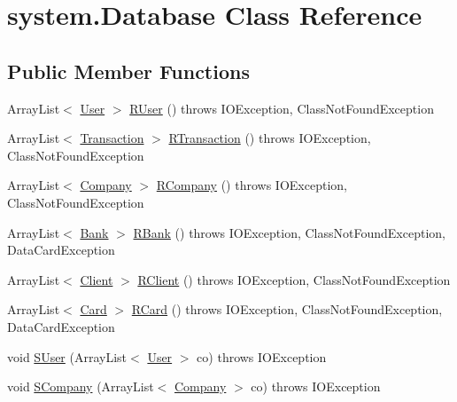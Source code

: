 \hypertarget{classsystem_1_1_database}{}\section{system.\+Database Class Reference}
\label{classsystem_1_1_database}
\subsection*{Public Member Functions}
\begin{DoxyCompactItemize}
\item 
Array\+List$<$ \mbox{\hyperlink{classmodules_1_1center_1_1_user}{User}} $>$ \mbox{\hyperlink{classsystem_1_1_database_a563b32594ca62b2a365614df76f88a32}{R\+User}} ()  throws I\+O\+Exception, Class\+Not\+Found\+Exception 
\item 
Array\+List$<$ \mbox{\hyperlink{classmodules_1_1center_1_1_transaction}{Transaction}} $>$ \mbox{\hyperlink{classsystem_1_1_database_a699e545bc13bed8b01d1fa3748915656}{R\+Transaction}} ()  throws I\+O\+Exception, Class\+Not\+Found\+Exception
\item 
Array\+List$<$ \mbox{\hyperlink{classmodules_1_1company_1_1_company}{Company}} $>$ \mbox{\hyperlink{classsystem_1_1_database_a8aa0cd11f470af2f79e39447ded74416}{R\+Company}} ()  throws I\+O\+Exception, Class\+Not\+Found\+Exception
\item 
Array\+List$<$ \mbox{\hyperlink{classmodules_1_1bank_1_1_bank}{Bank}} $>$ \mbox{\hyperlink{classsystem_1_1_database_a1cd62e343cf922e01a0c78507793797d}{R\+Bank}} ()  throws I\+O\+Exception, Class\+Not\+Found\+Exception, Data\+Card\+Exception
\item 
Array\+List$<$ \mbox{\hyperlink{classmodules_1_1_client}{Client}} $>$ \mbox{\hyperlink{classsystem_1_1_database_a7fa9b0351cb06cb2791c1315363d58ed}{R\+Client}} ()  throws I\+O\+Exception, Class\+Not\+Found\+Exception
\item 
Array\+List$<$ \mbox{\hyperlink{classmodules_1_1bank_1_1_card}{Card}} $>$ \mbox{\hyperlink{classsystem_1_1_database_aa5a502f945de7e737fa11ffedf2a708e}{R\+Card}} ()  throws I\+O\+Exception, Class\+Not\+Found\+Exception, Data\+Card\+Exception
\item 
void \mbox{\hyperlink{classsystem_1_1_database_aaf148920dea060c0549a7482d2b5df33}{S\+User}} (Array\+List$<$ \mbox{\hyperlink{classmodules_1_1center_1_1_user}{User}} $>$ co)  throws I\+O\+Exception 
\item 
void \mbox{\hyperlink{classsystem_1_1_database_a4de6d2521c128d80081d8723cf13e155}{S\+Company}} (Array\+List$<$ \mbox{\hyperlink{classmodules_1_1company_1_1_company}{Company}} $>$ co)  throws I\+O\+Exception 

\end{DoxyCompactItemize}
